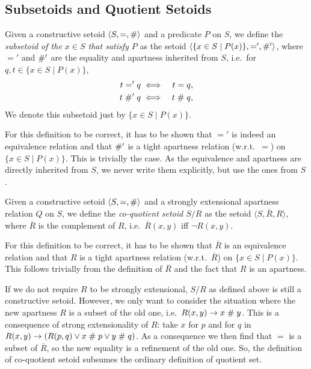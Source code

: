 \subsection{Subsetoids and Quotient Setoids}
\begin{definition}\label{defsubset}
Given a constructive setoid $\langle S, =, \mathrel{\#} \rangle$ and a
predicate $P$ on $S$, we define the {\em subsetoid of the $x\in S$
that satisfy $P$\/} as the setoid $\langle \{ x\in S \mid P (x) \},
=', \mathrel{\#}' \rangle$, where $='$ and $\mathrel{\#}'$ are the equality and
apartness inherited from $S$, i.e.\ for $q,t\in \{ x\in S \mid P (x) \}$,
\begin{eqnarray*}
 t='q &\iff & t =q,\\
 t\mathrel{\#}'q &\iff & t \mathrel{\#} q,\\ 
\end{eqnarray*}
We denote this subsetoid just by $\{ x\in S \mid P (x) \}$.
\end{definition}

For this definition to be correct, it has to be shown that $='$ is
indeed an equivalence relation and that $\mathrel{\#}'$ is a tight apartness
relation (w.r.t.\ $=$) on $\{ x\in S \mid P (x) \}$. This is trivially
the case. As the equivalence and apartness are directly inherited from
$S$, we never write them explicitly, but use the ones from $S$.

\begin{definition}\label{quotset}
Given a constructive setoid $\langle S, =, \mathrel{\#} \rangle$ and a
strongly extensional apartness relation $Q$ on $S$, we define the {\em
co-quotient setoid $S/R$\/} as the setoid $\langle S,\overline{R} , R
\rangle$, where $\overline{R}$ is the complement of $R$, i.e.\
$\overline{R} (x,y)$ iff $\neg R(x,y)$.
\end{definition}

For this definition to be correct, it has to be shown that
$\overline{R}$ is an equivalence relation and that $R$ is a tight
apartness relation (w.r.t.\ $\overline{R}$) on $\{ x\in S \mid P (x)
\}$. This follows trivially from the definition of $\overline{R}$ and
the fact that $R$ is an apartness.

If we do not require $R$ to be strongly extensional, $S/R$ as defined
above is still a constructive setoid. However, we only want to
consider the situation where the new apartness $R$ is a subset of the
old one, i.e.\ $R(x,y) \rightarrow x\mathrel{\#} y$. This is a consequence of
strong extensionality of $R$: take $x$ for $p$ and for $q$ in $R(x,y)
\rightarrow (R(p,q) \vee x\mathrel{\#} p \vee y \mathrel{\#} q)$.  As a consequence we
then find that $=$ is a subset of $\overline{R}$, so the new equality
is a refinement of the old one. So, the definition of co-quotient
setoid subsumes the ordinary definition of quotient set.

